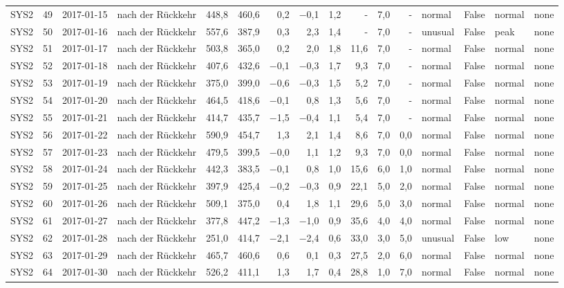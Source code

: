 \begin{tabular}{lrllrrrrrrrrlrll}
SYS2 & 49 & 2017-01-15 & nach der Rückkehr & 448,8 & 460,6 & 0,2 & $-$0,1 & 1,2 & - & 7,0 & - & normal & False & normal & none \\
SYS2 & 50 & 2017-01-16 & nach der Rückkehr & 557,6 & 387,9 & 0,3 & 2,3 & 1,4 & - & 7,0 & - & unusual & False & peak & none \\
SYS2 & 51 & 2017-01-17 & nach der Rückkehr & 503,8 & 365,0 & 0,2 & 2,0 & 1,8 & 11,6 & 7,0 & - & normal & False & normal & none \\
SYS2 & 52 & 2017-01-18 & nach der Rückkehr & 407,6 & 432,6 & $-$0,1 & $-$0,3 & 1,7 & 9,3 & 7,0 & - & normal & False & normal & none \\
SYS2 & 53 & 2017-01-19 & nach der Rückkehr & 375,0 & 399,0 & $-$0,6 & $-$0,3 & 1,5 & 5,2 & 7,0 & - & normal & False & normal & none \\
SYS2 & 54 & 2017-01-20 & nach der Rückkehr & 464,5 & 418,6 & $-$0,1 & 0,8 & 1,3 & 5,6 & 7,0 & - & normal & False & normal & none \\
SYS2 & 55 & 2017-01-21 & nach der Rückkehr & 414,7 & 435,7 & $-$1,5 & $-$0,4 & 1,1 & 5,4 & 7,0 & - & normal & False & normal & none \\
SYS2 & 56 & 2017-01-22 & nach der Rückkehr & 590,9 & 454,7 & 1,3 & 2,1 & 1,4 & 8,6 & 7,0 & 0,0 & normal & False & normal & none \\
SYS2 & 57 & 2017-01-23 & nach der Rückkehr & 479,5 & 399,5 & $-$0,0 & 1,1 & 1,2 & 9,3 & 7,0 & 0,0 & normal & False & normal & none \\
SYS2 & 58 & 2017-01-24 & nach der Rückkehr & 442,3 & 383,5 & $-$0,1 & 0,8 & 1,0 & 15,6 & 6,0 & 1,0 & normal & False & normal & none \\
SYS2 & 59 & 2017-01-25 & nach der Rückkehr & 397,9 & 425,4 & $-$0,2 & $-$0,3 & 0,9 & 22,1 & 5,0 & 2,0 & normal & False & normal & none \\
SYS2 & 60 & 2017-01-26 & nach der Rückkehr & 509,1 & 375,0 & 0,4 & 1,8 & 1,1 & 29,6 & 5,0 & 3,0 & normal & False & normal & none \\
SYS2 & 61 & 2017-01-27 & nach der Rückkehr & 377,8 & 447,2 & $-$1,3 & $-$1,0 & 0,9 & 35,6 & 4,0 & 4,0 & normal & False & normal & none \\
SYS2 & 62 & 2017-01-28 & nach der Rückkehr & 251,0 & 414,7 & $-$2,1 & $-$2,4 & 0,6 & 33,0 & 3,0 & 5,0 & unusual & False & low & none \\
SYS2 & 63 & 2017-01-29 & nach der Rückkehr & 465,7 & 460,6 & 0,6 & 0,1 & 0,3 & 27,5 & 2,0 & 6,0 & normal & False & normal & none \\
SYS2 & 64 & 2017-01-30 & nach der Rückkehr & 526,2 & 411,1 & 1,3 & 1,7 & 0,4 & 28,8 & 1,0 & 7,0 & normal & False & normal & none \\

\end{tabular}
